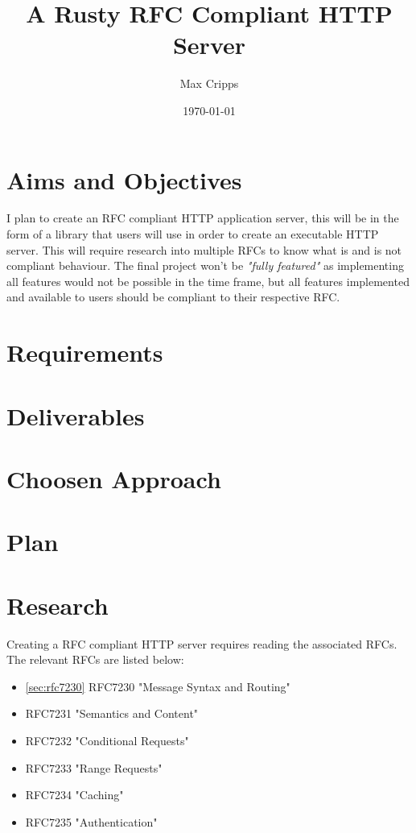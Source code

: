 \documentclass[12pt, a4paper]{article}
\title{A Rusty RFC Compliant HTTP Server}
\author{Max Cripps}
\date{\today}
\begin{document}
\maketitle 

\section{Aims and Objectives}

I plan to create an RFC compliant HTTP application server, this will be in the form of a library that
users will use in order to create an executable HTTP server. This will require research into multiple
RFCs to know what is and is not compliant behaviour. The final project won't be
\emph{"fully featured"} as implementing all features would not be possible in the time frame,
but all features implemented and available to users should be compliant to their respective RFC.

\section{Requirements}

\section{Deliverables}

\section{Choosen Approach}

\section{Plan}

\section{Research}

Creating a RFC compliant HTTP server requires reading the associated RFCs. The relevant RFCs are listed
below:
\begin{itemize}
    \item \ref{sec:rfc7230} RFC7230 "Message Syntax and Routing"
    \item RFC7231 "Semantics and Content"
    \item RFC7232 "Conditional Requests"
    \item RFC7233 "Range Requests"
    \item RFC7234 "Caching"
    \item RFC7235 "Authentication"
\end{itemize}
\end{document}
